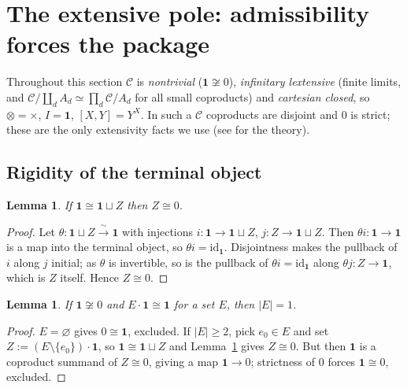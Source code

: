 \documentclass[11pt]{amsart}
\theoremstyle{plain}
\newtheorem{lemma}[theorem]{Lemma}
\theoremstyle{definition}
\newcommand{\C}{\mathcal{C}}
\newcommand{\one}{\mathbf{1}}
\begin{document}
\section{The extensive pole: admissibility forces the package}\label{sec:extensive}

Throughout this section $\C$ is \emph{nontrivial} ($\one\not\cong 0$), \emph{infinitary lextensive}
(finite limits, and $\C/\!\coprod_d A_d\simeq\prod_d\C/A_d$ for all small coproducts) and
\emph{cartesian closed}, so $\otimes=\times$, $I=\one$, $[X,Y]=Y^X$. In such a $\C$ coproducts are
disjoint and $0$ is strict; these are the only extensivity facts we use (see \cite{CLW} for the
theory).

\subsection{Rigidity of the terminal object}

\begin{lemma}\label{lem:E1}
If $\one\cong\one\sqcup Z$ then $Z\cong 0$.
\end{lemma}
\begin{proof}
Let $\theta:\one\sqcup Z\xrightarrow{\ \sim\ }\one$ with injections $i:\one\to\one\sqcup Z$,
$j:Z\to\one\sqcup Z$. Then $\theta i:\one\to\one$ is a map into the terminal object, so
$\theta i=\mathrm{id}_{\one}$. Disjointness makes the pullback of $i$ along $j$ initial; as $\theta$
is invertible, so is the pullback of $\theta i=\mathrm{id}_{\one}$ along $\theta j:Z\to\one$, which is
$Z$ itself. Hence $Z\cong 0$.
\end{proof}

\begin{lemma}\label{lem:E2}
If $\one\not\cong 0$ and $E\cdot\one\cong\one$ for a set $E$, then $|E|=1$.
\end{lemma}
\begin{proof}
$E=\varnothing$ gives $0\cong\one$, excluded. If $|E|\ge 2$, pick $e_0\in E$ and set
$Z:=(E\setminus\{e_0\})\cdot\one$, so $\one\cong\one\sqcup Z$ and Lemma~\ref{lem:E1} gives $Z\cong 0$.
But then $\one$ is a coproduct summand of $Z\cong 0$, giving a map $\one\to 0$; strictness of $0$
forces $\one\cong 0$, excluded.
\end{proof}
\end{document}
